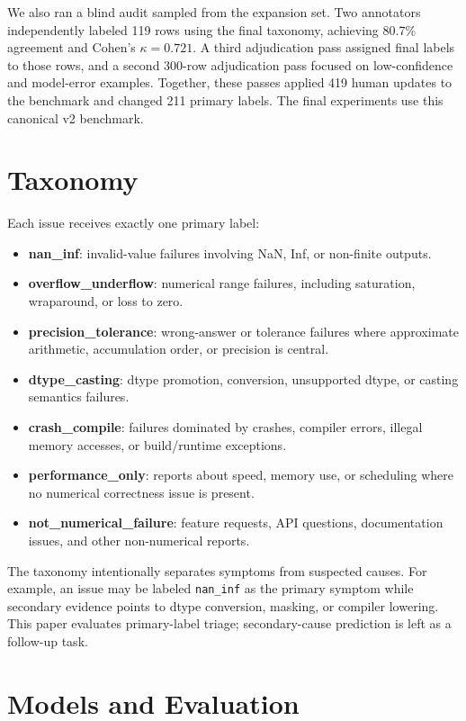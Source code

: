 \documentclass[conference]{IEEEtran}
\begin{document}
We also ran a blind audit sampled from the expansion set. Two annotators
independently labeled 119 rows using the final taxonomy, achieving 80.7\%
agreement and Cohen's $\kappa=0.721$. A third adjudication pass assigned final
labels to those rows, and a second 300-row adjudication pass focused on
low-confidence and model-error examples. Together, these passes applied 419
human updates to the benchmark and changed 211 primary labels. The final
experiments use this canonical v2 benchmark.

\section{Taxonomy}

Each issue receives exactly one primary label:
\begin{itemize}
    \item \textbf{nan\_inf}: invalid-value failures involving NaN, Inf, or
    non-finite outputs.
    \item \textbf{overflow\_underflow}: numerical range failures, including
    saturation, wraparound, or loss to zero.
    \item \textbf{precision\_tolerance}: wrong-answer or tolerance failures
    where approximate arithmetic, accumulation order, or precision is central.
    \item \textbf{dtype\_casting}: dtype promotion, conversion, unsupported
    dtype, or casting semantics failures.
    \item \textbf{crash\_compile}: failures dominated by crashes, compiler
    errors, illegal memory accesses, or build/runtime exceptions.
    \item \textbf{performance\_only}: reports about speed, memory use, or
    scheduling where no numerical correctness issue is present.
    \item \textbf{not\_numerical\_failure}: feature requests, API questions,
    documentation issues, and other non-numerical reports.
\end{itemize}

The taxonomy intentionally separates symptoms from suspected causes. For
example, an issue may be labeled \texttt{nan\_inf} as the primary symptom while
secondary evidence points to dtype conversion, masking, or compiler lowering.
This paper evaluates primary-label triage; secondary-cause prediction is left
as a follow-up task.

\section{Models and Evaluation}
\end{document}
